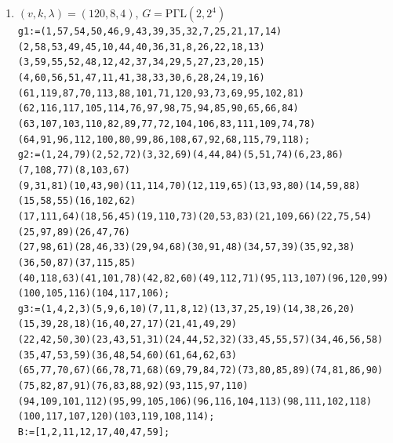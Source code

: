 \documentclass[a4paper,twopage,reqno,12pt]{amsart}
\theoremstyle{definition}
\numberwithin{equation}{section}
\newcommand{\PGaL}{\mathrm{P\Gamma L}}
\newcommand{\Aut}{\mathrm{Aut}}
\begin{document}
\begin{enumerate}
 \item\label{12084_2} $(v,k,\lambda)=(120,8,4)$, $G=\PGaL(2,2^4)$\\
    {\tiny \texttt{g1:=(1,57,54,50,46,9,43,39,35,32,7,25,21,17,14)(2,58,53,49,45,10,44,40,36,31,8,26,22,18,13)\\
    (3,59,55,52,48,12,42,37,34,29,5,27,23,20,15)(4,60,56,51,47,11,41,38,33,30,6,28,24,19,16)\\
    (61,119,87,70,113,88,101,71,120,93,73,69,95,102,81)(62,116,117,105,114,76,97,98,75,94,85,90,65,66,84)\\
    (63,107,103,110,82,89,77,72,104,106,83,111,109,74,78)(64,91,96,112,100,80,99,86,108,67,92,68,115,79,118);}\\
    \texttt{g2:=(1,24,79)(2,52,72)(3,32,69)(4,44,84)(5,51,74)(6,23,86)(7,108,77)(8,103,67)\\(9,31,81)(10,43,90)(11,114,70)(12,119,65)(13,93,80)(14,59,88)(15,58,55)(16,102,62)\\
    (17,111,64)(18,56,45)(19,110,73)(20,53,83)(21,109,66)(22,75,54)(25,97,89)(26,47,76)\\
    (27,98,61)(28,46,33)(29,94,68)(30,91,48)(34,57,39)(35,92,38)(36,50,87)(37,115,85)\\
    (40,118,63)(41,101,78)(42,82,60)(49,112,71)(95,113,107)(96,120,99)(100,105,116)(104,117,106);}\\
    \texttt{g3:=(1,4,2,3)(5,9,6,10)(7,11,8,12)(13,37,25,19)(14,38,26,20)(15,39,28,18)(16,40,27,17)(21,41,49,29)\\
(22,42,50,30)(23,43,51,31)(24,44,52,32)(33,45,55,57)(34,46,56,58)(35,47,53,59)(36,48,54,60)(61,64,62,63)\\
(65,77,70,67)(66,78,71,68)(69,79,84,72)(73,80,85,89)(74,81,86,90)(75,82,87,91)(76,83,88,92)(93,115,97,110)\\
(94,109,101,112)(95,99,105,106)(96,116,104,113)(98,111,102,118)(100,117,107,120)(103,119,108,114);}\\}
    \texttt{B:=[1,2,11,12,17,40,47,59];}\\


\end{enumerate}
\end{document}

